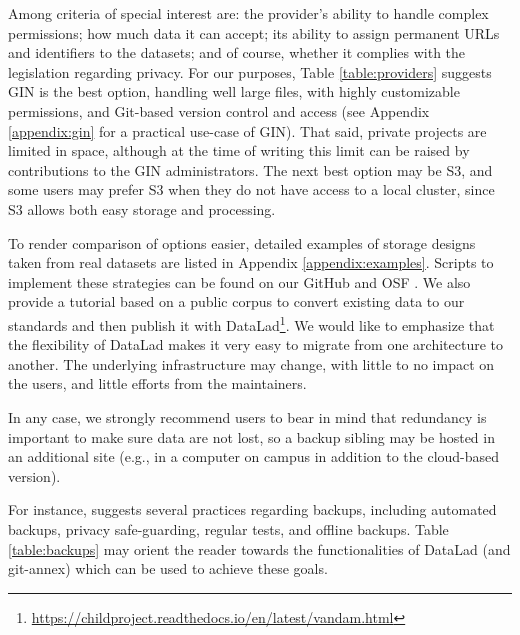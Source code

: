 \documentclass[smallextended]{svjour3}       %
\begin{document}
Among criteria of special interest are: the provider's ability to handle complex permissions; how much data it can accept; its ability to assign permanent URLs and identifiers to the datasets; and of course, whether it complies with the legislation regarding privacy. For our purposes, Table \ref{table:providers} suggests GIN is the best option, handling well large files, with highly customizable permissions, and Git-based version control and access (see Appendix \ref{appendix:gin} for a practical use-case of GIN). That said, private projects are limited in space, although at the time of writing this limit can be raised by contributions to the GIN administrators. The next best option may be S3, and some users may prefer S3 when they do not have access to a local cluster, since S3 allows both easy storage and processing. 

To render comparison of options easier, detailed examples of storage designs taken from real datasets are listed in Appendix \ref{appendix:examples}. Scripts to implement these strategies can be found on our GitHub and OSF \citep{datalad_procedures}. We also provide a tutorial based on a public corpus \citep{vandam-day} to convert existing data to our standards and then publish it with DataLad\footnote{\url{https://childproject.readthedocs.io/en/latest/vandam.html}}.
We would like to emphasize that the flexibility of DataLad makes it very easy to migrate from one architecture to another. The underlying infrastructure may change, with little to no impact on the users, and little efforts from the maintainers.

In any case, we strongly recommend users to bear in mind that redundancy is important to make sure data are not lost, so a backup sibling may be hosted in an additional site (e.g., in a computer on campus in addition to the cloud-based version). 

For instance, \citet{Perkel_2019} suggests several practices regarding backups, including automated backups, privacy safe-guarding, regular tests, and offline backups. Table \ref{table:backups} may orient the reader towards the functionalities of DataLad (and git-annex) which can be used to achieve these goals.
\end{document}
